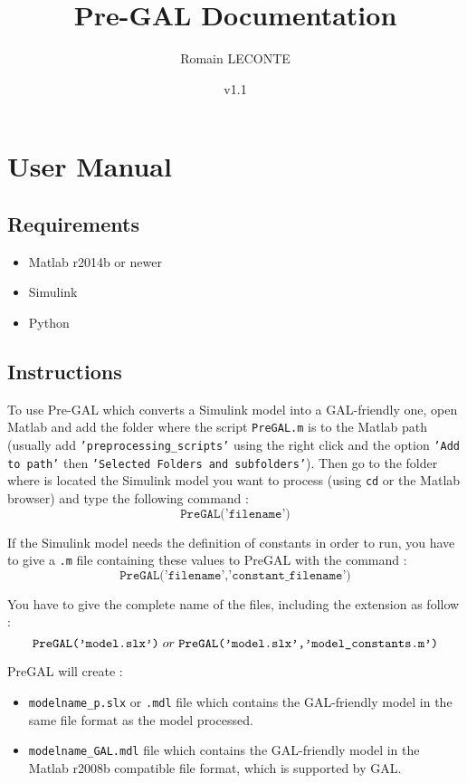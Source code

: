 \documentclass[a4paper,12pt]{article}
\begin{document}
\title{Pre-GAL Documentation}
\author{Romain LECONTE}
\date{v1.1}
\maketitle
\newpage

\section{User Manual}

\subsection{Requirements}
\begin{itemize}
\item
Matlab r2014b or newer
\item
Simulink
\item
Python
\end{itemize}

\subsection{Instructions}
To use Pre-GAL which converts a Simulink model into a GAL-friendly one, open Matlab and add the folder where the script \texttt{PreGAL.m} is to the Matlab path (usually add \texttt{'preprocessing\_scripts'} using the right click and the option \texttt{'Add to path'} then \texttt{'Selected Folders and subfolders'}). \newline
Then go to the folder where is located the Simulink model you want to process (using \texttt{cd} or the Matlab browser) and type the following command :
$$\texttt{PreGAL('filename')}$$

If the Simulink model needs the definition of constants in order to run, you have to give a \texttt{.m} file containing these values to PreGAL  with the command :
$$\texttt{PreGAL('filename','constant\_filename')}$$

You have to give the complete name of the files, including the extension as follow :
$$\texttt{PreGAL('model.slx')} \hspace{0.1cm} or \hspace{0.1cm}
\texttt{PreGAL('model.slx','model\_constants.m')}$$

PreGAL will create :
\begin{itemize}
\item
\texttt{modelname\_p.slx} or \texttt{.mdl} file which contains the GAL-friendly model in the same file format as the model processed.
\item
\texttt{modelname\_GAL.mdl} file which contains the GAL-friendly model in the Matlab r2008b compatible file format, which is supported by GAL.
\end{itemize}
\end{document}
